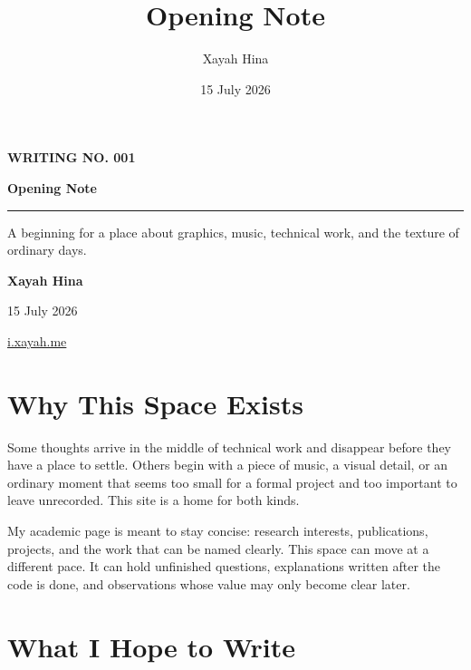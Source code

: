 \documentclass[11pt,a4paper]{article}
\title{\textbf{Opening Note}}
\author{Xayah Hina}
\date{15 July 2026}
\begin{document}
\hypersetup{pageanchor=false}
\begin{titlepage}
  \thispagestyle{empty}

  {\small\bfseries\color{accent}\MakeUppercase{Writing No. 001}\par}

  \vspace*{0.2\textheight}

  {\fontsize{39}{43}\selectfont\bfseries\color{ink}Opening Note\par}

  \vspace{2.2em}
  {\color{rulecolor}\rule{\textwidth}{0.7pt}\par}
  \vspace{1.4em}

  {\large\color{softink}
    A beginning for a place about graphics, music, technical work,
    and the texture of ordinary days.\par
  }

  \vfill

  {\large\bfseries Xayah Hina\par}
  \vspace{0.35em}
  {\color{softink}15 July 2026\par}
  \vspace{0.35em}
  {\small\href{https://i.xayah.me/}{i.xayah.me}\par}
\end{titlepage}
\hypersetup{pageanchor=true}

\section{Why This Space Exists}

Some thoughts arrive in the middle of technical work and disappear before
they have a place to settle. Others begin with a piece of music, a visual
detail, or an ordinary moment that seems too small for a formal project and
too important to leave unrecorded. This site is a home for both kinds.

My academic page is meant to stay concise: research interests, publications,
projects, and the work that can be named clearly. This space can move at a
different pace. It can hold unfinished questions, explanations written after
the code is done, and observations whose value may only become clear later.

\section{What I Hope to Write}
\end{document}
